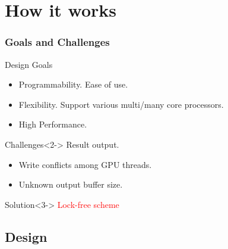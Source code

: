 \section{How it works}
\begin{frame}
\frametitle{Goals and Challenges}
\begin{block}{Design Goals}
\begin{itemize}
\item Programmability. Ease of use. 
\item Flexibility. Support various multi/many core processors.
\item High Performance.
\end{itemize}
\end{block}
\begin{block}{Challenges}<2->
Result output.
\begin{itemize}
\item Write conflicts among GPU threads.
\item Unknown output buffer size. 
\end{itemize}
\end{block}
\begin{block}{Solution}<3->
\textcolor{red}{Lock-free scheme}
\end{block}
\end{frame}

\subsection{Design}

